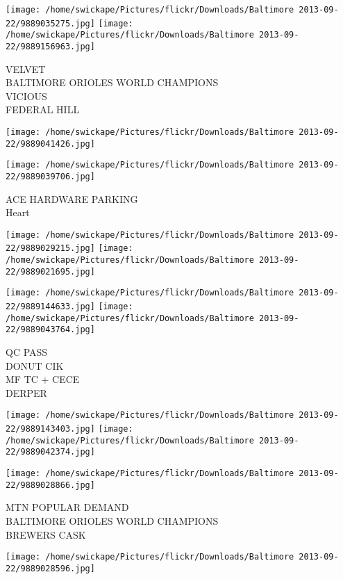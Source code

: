\documentclass[10pt,letterpaper]{article}
\begin{document}
\texttt{[image: /home/swickape/Pictures/flickr/Downloads/Baltimore 2013-09-22/9889035275.jpg]}
\texttt{[image: /home/swickape/Pictures/flickr/Downloads/Baltimore 2013-09-22/9889156963.jpg]}

VELVET\\
BALTIMORE ORIOLES WORLD CHAMPIONS\\
VICIOUS\\
FEDERAL HILL\\
\pagebreak

\texttt{[image: /home/swickape/Pictures/flickr/Downloads/Baltimore 2013-09-22/9889041426.jpg]}

\vspace{0.25in}
\texttt{[image: /home/swickape/Pictures/flickr/Downloads/Baltimore 2013-09-22/9889039706.jpg]}

ACE HARDWARE PARKING\\
Heart\\
\pagebreak

\texttt{[image: /home/swickape/Pictures/flickr/Downloads/Baltimore 2013-09-22/9889029215.jpg]}
\texttt{[image: /home/swickape/Pictures/flickr/Downloads/Baltimore 2013-09-22/9889021695.jpg]}

\texttt{[image: /home/swickape/Pictures/flickr/Downloads/Baltimore 2013-09-22/9889144633.jpg]}
\texttt{[image: /home/swickape/Pictures/flickr/Downloads/Baltimore 2013-09-22/9889043764.jpg]}

QC PASS\\
DONUT CIK\\
MF TC + CECE\\
DERPER\\
\pagebreak

\texttt{[image: /home/swickape/Pictures/flickr/Downloads/Baltimore 2013-09-22/9889143403.jpg]}
\texttt{[image: /home/swickape/Pictures/flickr/Downloads/Baltimore 2013-09-22/9889042374.jpg]}

\texttt{[image: /home/swickape/Pictures/flickr/Downloads/Baltimore 2013-09-22/9889028866.jpg]}

MTN POPULAR DEMAND\\
BALTIMORE ORIOLES WORLD CHAMPIONS\\
BREWERS CASK\\
\pagebreak

\texttt{[image: /home/swickape/Pictures/flickr/Downloads/Baltimore 2013-09-22/9889028596.jpg]}
\end{document}
